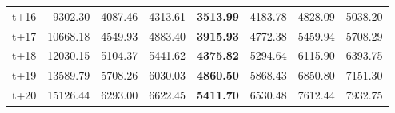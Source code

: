 \begin{table}[H]
\begin{tabular}{lrrrrrrr}
t+16  & 9302.30  & 4087.46  & 4313.61  & \textbf{3513.99}  & 4183.78  & 4828.09  & 5038.20  \\
t+17  & 10668.18  & 4549.93  & 4883.40  & \textbf{3915.93}  & 4772.38  & 5459.94  & 5708.29  \\
t+18  & 12030.15  & 5104.37  & 5441.62  & \textbf{4375.82}  & 5294.64  & 6115.90  & 6393.75  \\
t+19  & 13589.79  & 5708.26  & 6030.03  & \textbf{4860.50}  & 5868.43  & 6850.80  & 7151.30  \\
t+20  & 15126.44  & 6293.00  & 6622.45  & \textbf{5411.70}  & 6530.48  & 7612.44  & 7932.75  \\

\bottomrule
\end{tabular}
\end{table}

